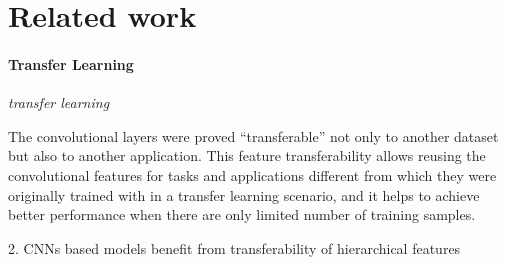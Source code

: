 \section{Related work}
\label{sec:related}

%

\paragraph{Transfer Learning}
\noindent \textit{transfer learning}

The convolutional layers were proved ``transferable'' not only to another dataset\cite{yosinski2014transferable} but also to another application\cite{girshick2014rich,long2015fully}.
This feature transferability allows reusing the convolutional features for tasks and applications different from which they were originally trained with in a transfer learning scenario, and it helps to achieve better performance when there are only limited number of training samples\cite{long2015fully}.

{2. CNNs based models benefit from transferability of hierarchical features}

